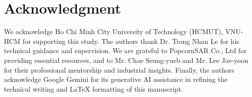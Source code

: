 \documentclass[conference]{IEEEtran}
\begin{document}


\section*{Acknowledgment}

We acknowledge Ho Chi Minh City University of Technology (HCMUT), VNU-HCM for supporting this study. The authors thank Dr. Trong Nhan Le for his technical guidance and supervision. We are grateful to PopcornSAR Co., Ltd for providing essential resources, and to Mr. Chae Seung-yueb and Mr. Lee Jae-yoon for their professional mentorship and industrial insights. Finally, the authors acknowledge Google Gemini for its generative AI assistance in refining the technical writing and LaTeX formatting of this manuscript.



\end{document}
